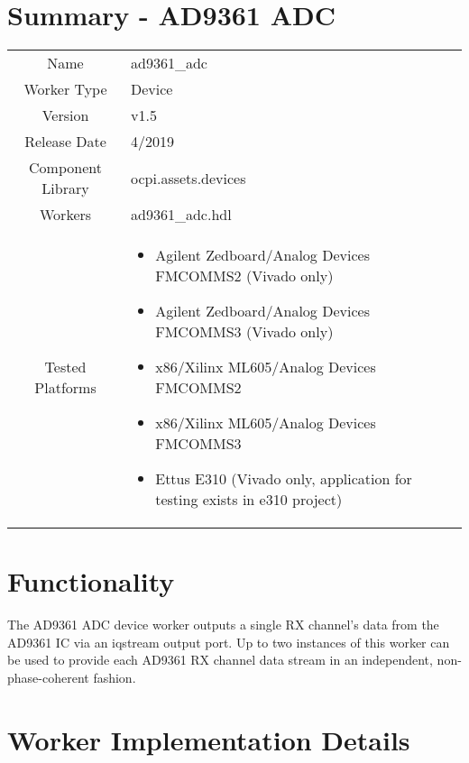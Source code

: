 \documentclass{article}
\author{} %
\date{Version \docVersion} %
\title{\docTitle}
\def\docVersion{1.5}
\def\comp{ad9361\_adc}
\def\Comp{AD9361 ADC}
\begin{document}
\section*{Summary - \Comp}
\begin{tabular}{|c|M{13.5cm}|}
	\hline
	                  &                  \\
	\hline
	Name              & \comp            \\
	\hline
	Worker Type       & Device           \\
	\hline
	Version           & v\docVersion   \\
	\hline
	Release Date      & 4/2019           \\
	\hline
	Component Library & ocpi.assets.devices     \\
	\hline
	Workers           & \comp.hdl        \\
	\hline
	Tested Platforms  &
\begin{itemize}
  \item Agilent Zedboard/Analog Devices FMCOMMS2 (Vivado only)
  \item Agilent Zedboard/Analog Devices FMCOMMS3 (Vivado only)
  \item x86/Xilinx ML605/Analog Devices FMCOMMS2
  \item x86/Xilinx ML605/Analog Devices FMCOMMS3
  \item Ettus E310 (Vivado only, application for testing exists in e310 project)
\end{itemize} \\
	\hline
\end{tabular}
\section*{Functionality}
	The \Comp{} device worker outputs a single RX channel's data from the AD9361 IC\cite{ad9361} via an iqstream output port. Up to two instances of this worker can be used to provide each AD9361 RX channel data stream in an independent, non-phase-coherent fashion.

\section*{Worker Implementation Details}
\end{document}
